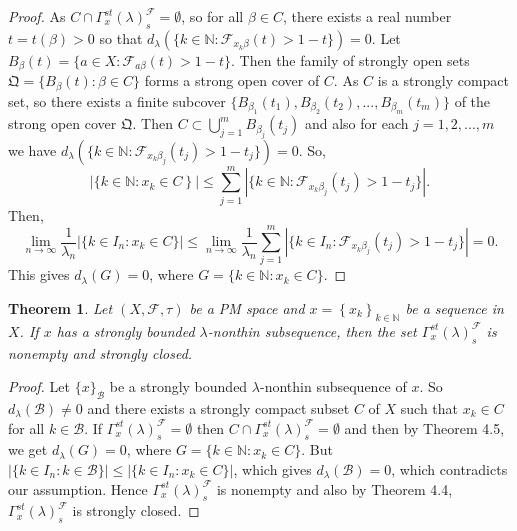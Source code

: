 \documentclass[reqno,b5paper]{amsart}
\theoremstyle{plain}
\newtheorem{thm}{Theorem}[section]
\theoremstyle{definition}
\begin{document}
\begin{proof}
As $C\cap\Gamma_x^{st}(\lambda)^\mathcal{F}_{s}=\emptyset$, so for
all $\beta\in C$, there exists a real number $t=t(\beta)>0$ so
that
$d_\lambda(\{k\in\mathbb{N}:\mathcal{F}_{x_k\beta}(t)>1-t\})=0$.
Let $B_\beta(t)=\{a\in X:\mathcal{F}_{a\beta}(t)>1-t\}$. Then the
family of strongly open sets $\mathfrak{Q}=\{B_\beta(t):\beta\in
C\}$ forms a strong open cover of $C$. As $C$ is a strongly
compact set, so there exists a finite subcover
$\{B_{\beta_1}(t_1),B_{\beta_2}(t_2),...,B_{\beta_m}(t_m)\}$ of
the strong open cover $\mathfrak{Q}$. Then
$C\subset\bigcup\limits_{j=1}^mB_{\beta_j}(t_j)$ and also for each
$j=1,2,...,m$ we have
$d_\lambda(\{k\in\mathbb{N}:\mathcal{F}_{x_k\beta_j}(t_j)>1-t_j\})=0$.
So,
$$\left|\{k\in\mathbb{N}:x_k\in C\right\}|\leq\sum\limits_{j=1}^m\left|\{k\in\mathbb{N}:\mathcal{F}_{x_k\beta_j}(t_j)>1-t_j\}\right|.$$ Then,
$$\lim\limits_{n\rightarrow\infty}\frac{1}{\lambda_n}\left|\{k\in
I_n: x_k\in C\}\right|
\leq\lim\limits_{n\rightarrow\infty}\frac{1}{\lambda_n}\sum\limits_{j=1}^m\left|\{k\in
I_n:\mathcal{F}_{x_k\beta_j}(t_j)>1-t_j\}\right|=0.$$ This gives
$d_\lambda(G)=0$, where $G=\{k\in\mathbb{N}:x_k\in C\}$.
\end{proof}
\begin{thm}
Let $(X,\mathcal{F},\tau)$ be a PM space and
$x=\left\{x_{k}\right\}_{k\in\mathbb N}$ be a sequence in $X$. If
$x$ has a strongly bounded $\lambda$-nonthin subsequence, then the
set $\Gamma_x^{st}(\lambda)^\mathcal{F}_{s}$ is nonempty and
strongly closed.
\end{thm}
\begin{proof}
Let $\{x\}_\mathcal{B}$ be a strongly bounded $\lambda$-nonthin
subsequence of $x$. So $d_\lambda(\mathcal{B})\neq 0$ and there
exists a strongly compact subset $C$ of $X$ such that $x_k\in C$
for all $k\in \mathcal{B}$. If
$\Gamma_x^{st}(\lambda)^\mathcal{F}_{s}=\emptyset$ then
$C\cap\Gamma_x^{st}(\lambda)^\mathcal{F}_{s}=\emptyset$ and then
by Theorem 4.5, we get $d_\lambda(G)=0$, where
$G=\{k\in\mathbb{N}:x_k\in C\}$. But $\left|\{k\in
I_n:k\in\mathcal{B}\}\right|\leq \left|\{k\in I_n:x_k\in
C\}\right|$, which gives $d_\lambda(\mathcal{B})=0$, which
contradicts our assumption. Hence
$\Gamma_x^{st}(\lambda)^\mathcal{F}_{s}$ is nonempty and also by
Theorem 4.4, $\Gamma_x^{st}(\lambda)^\mathcal{F}_{s}$ is strongly
closed.
\end{proof}
\end{document}
